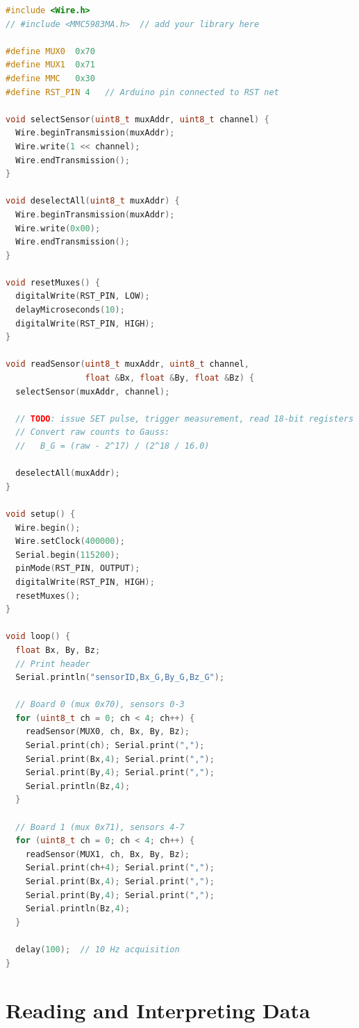 \documentclass[12pt]{article}
\begin{document}
\begin{lstlisting}[language=C++, caption={Firmware skeleton --- main loop}]
#include <Wire.h>
// #include <MMC5983MA.h>  // add your library here

#define MUX0  0x70
#define MUX1  0x71
#define MMC   0x30
#define RST_PIN 4   // Arduino pin connected to RST net

void selectSensor(uint8_t muxAddr, uint8_t channel) {
  Wire.beginTransmission(muxAddr);
  Wire.write(1 << channel);
  Wire.endTransmission();
}

void deselectAll(uint8_t muxAddr) {
  Wire.beginTransmission(muxAddr);
  Wire.write(0x00);
  Wire.endTransmission();
}

void resetMuxes() {
  digitalWrite(RST_PIN, LOW);
  delayMicroseconds(10);
  digitalWrite(RST_PIN, HIGH);
}

void readSensor(uint8_t muxAddr, uint8_t channel,
                float &Bx, float &By, float &Bz) {
  selectSensor(muxAddr, channel);

  // TODO: issue SET pulse, trigger measurement, read 18-bit registers
  // Convert raw counts to Gauss:
  //   B_G = (raw - 2^17) / (2^18 / 16.0)

  deselectAll(muxAddr);
}

void setup() {
  Wire.begin();
  Wire.setClock(400000);
  Serial.begin(115200);
  pinMode(RST_PIN, OUTPUT);
  digitalWrite(RST_PIN, HIGH);
  resetMuxes();
}

void loop() {
  float Bx, By, Bz;
  // Print header
  Serial.println("sensorID,Bx_G,By_G,Bz_G");

  // Board 0 (mux 0x70), sensors 0-3
  for (uint8_t ch = 0; ch < 4; ch++) {
    readSensor(MUX0, ch, Bx, By, Bz);
    Serial.print(ch); Serial.print(",");
    Serial.print(Bx,4); Serial.print(",");
    Serial.print(By,4); Serial.print(",");
    Serial.println(Bz,4);
  }

  // Board 1 (mux 0x71), sensors 4-7
  for (uint8_t ch = 0; ch < 4; ch++) {
    readSensor(MUX1, ch, Bx, By, Bz);
    Serial.print(ch+4); Serial.print(",");
    Serial.print(Bx,4); Serial.print(",");
    Serial.print(By,4); Serial.print(",");
    Serial.println(Bz,4);
  }

  delay(100);  // 10 Hz acquisition
}
\end{lstlisting}

\newpage
\section{Reading and Interpreting Data}
\end{document}
